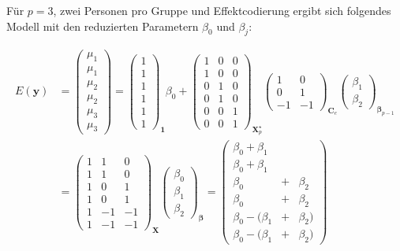 Für $p=3$, zwei Personen pro Gruppe und Effektcodierung ergibt sich folgendes Modell mit den reduzierten Parametern $\beta_{0}$ und $\beta_{j}$:

\begin{align*}
E(\bm{y}) &= \left(\begin{array}{c} \mu_{1}\\ \mu_{1}\\\hline \mu_{2}\\ \mu_{2}\\\hline \mu_{3}\\ \mu_{3}\end{array}\right)
 = \left(\begin{array}{c} 1\\ 1\\\hline 1\\ 1\\\hline 1\\ 1\end{array}\right)_{\bm{1}} \beta_{0} +
 \left(\begin{array}{ccc}
 1 & 0 & 0\\
 1 & 0 & 0\\\hline
 0 & 1 & 0\\
 0 & 1 & 0\\\hline
 0 & 0 & 1\\
 0 & 0 & 1
 \end{array}\right)_{\bm{X}_{p}^{\star}}
 \left(\begin{array}{rr}1 & 0 \\ 0 & 1 \\ -1 & -1 \end{array}\right)_{\bm{C}_{e}}
 \left(\begin{array}{c} \beta_{1}\\ \beta_{2}\end{array}\right)_{\bm{\beta}_{p-1}} \\
 &= \left(\begin{array}{crr}1 & 1 & 0\\ 1 & 1 & 0\\\hline 1 & 0 & 1\\ 1 & 0 & 1\\\hline 1 & -1 & -1\\ 1 & -1 & -1\end{array}\right)_{\bm{X}}
 \left(\begin{array}{c} \beta_{0}\\ \beta_{1}\\ \beta_{2}\end{array}\right)_{\bm{\beta}} =
 \left(\begin{array}{lcl}
 \beta_{0} +  \beta_{1} & &           \\
 \beta_{0} +  \beta_{1} & &           \\\hline
 \beta_{0}              &+& \beta_{2} \\
 \beta_{0}              &+& \beta_{2} \\\hline
 \beta_{0} - (\beta_{1} &+& \beta_{2})\\
 \beta_{0} - (\beta_{1} &+& \beta_{2})
 \end{array}\right)
\end{align*}

